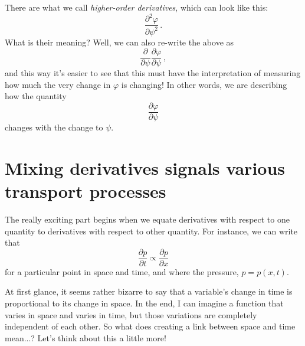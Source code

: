 There are what we call \textit{higher-order derivatives}, which can look like this:
\begin{equation*}\label{eq:change-partial-2nd}
\frac{\partial^2 \varphi}{\partial \psi^2} \, .
\end{equation*}
What is their meaning? Well, we can also re-write the above as
\begin{equation*}\label{eq:change-partial}
\frac{\partial}{\partial \psi} \frac{\partial \varphi}{\partial \psi} \, ,
\end{equation*}
and this way it's easier to see that this must have the interpretation of measuring how much the very change in $\varphi$ is changing! In other words, we are describing how the quantity 
\begin{equation*}\label{eq:second-derivative}
\frac{\partial \varphi}{\partial \psi}
\end{equation*}
changes with the change to $\psi$. 

\section{Mixing derivatives signals various transport processes} \label{sec:changes:mixing-derivatives}

The really exciting part begins when we equate derivatives with respect to one quantity to derivatives with respect to other quantity. For instance, we can write that
\begin{equation}\label{eq:dt-propto-dx}
\frac{\partial p}{\partial t} \propto \frac{\partial p}{\partial x}
\end{equation}
for a particular point in space and time, and where the pressure, $p = p(x, t)$.

At first glance, it seems rather bizarre to say that a variable's change in time is proportional to its change in space. In the end, I can imagine a function that varies in space and varies in time, but those variations are completely independent of each other. So what does creating a link between space and time mean...? Let's think about this a little more!

